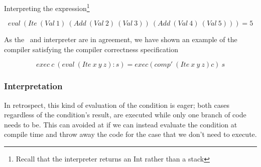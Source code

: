 \documentclass {article}
\begin{document}
Interpreting the expression\footnote{
Recall that the interpreter returns an Int rather than a stack}

	\[ eval\ (Ite\ (Val\ 1)\ (Add\ (Val\ 2)\ (Val\ 3))\ (Add\ (Val\ 4)\ (Val\ 5))) = 5\]

As the \vm\ and interpreter are in agreement,
we have shown an example of the compiler 
satisfying the compiler correctness specification

\[ exec\ c\ (eval\ (Ite\ x\ y\ z):s) 
	= exec (comp'\ (Ite\ x\ y\ z) c)\ s  \]

\subsubsection{Interpretation}

%

In retrospect, this kind of evaluation of the condition
is eager; both cases regardless of the
condition's result, are executed
while only one branch of code needs to be.
This can avoided at if we can instead
evaluate the condition at compile time
and throw away the code for the case
that we don't need to execute.
\end{document}

